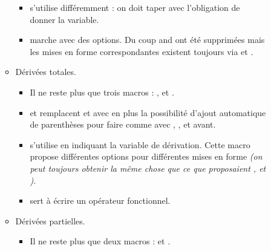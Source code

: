\documentclass[12pt,a4paper]{article}
\begin{document}
\begin{description}
\begin{itemize}[itemsep=.5em]
\begin{itemize}[itemsep=.5em]
\begin{itemize}[itemsep=.5em, label=$\rightarrow$]
                \item {} s'utilise différemment : on doit taper  avec l'obligation de donner la variable.
                
                \item {} marche avec des options.
                      Du coup  and  ont été supprimées mais les mises en forme correspondantes existent toujours via  et .
    	    \end{itemize}
    	    
            
            \item Dérivées totales.
            
            \begin{itemize}[itemsep=.5em, label=$\rightarrow$]
                \item Il ne reste plus que trois macros : ,  et .
    
                \item {} et  remplacent  et  avec en plus la possibilité d'ajout automatique de parenthèses pour faire comme avec , ,  et  avant.
    
    
                \item {} s'utilise en indiquant la variable de dérivation. Cette macro propose différentes options pour différentes mises en forme 
                      \emph{(on peut toujours obtenir la même chose que ce que proposaient ,  et )}.
    
                \item {} sert à écrire un opérateur fonctionnel.
    	    \end{itemize}
    
    
            \item Dérivées partielles.
            
            \begin{itemize}[itemsep=.5em, label=$\rightarrow$]
                \item Il ne reste plus que deux macros :  et .
    

\end{itemize}
\end{itemize}
\end{itemize}
\end{description}
\end{document}
